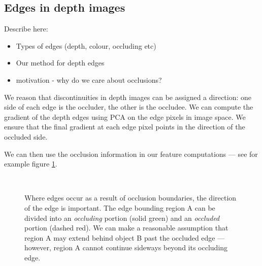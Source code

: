 \documentclass[10pt,twocolumn,letterpaper]{article}
\begin{document}
\subsection{Edges in depth images}
Describe here:
\begin{itemize}
\item Types of edges (depth, colour, occluding etc)
\item Our method for depth edges
\item motivation - why do we care about occlusions?
\end{itemize}

We reason that discontinuities in depth images can be assigned a direction: one side of each edge is the occluder, the other is the occludee. 
We can compute the gradient of the depth edges using PCA on the edge pixels in image space.
We ensure that the final gradient at each edge pixel points in the direction of the occluded side.

We can then use the occlusion information in our feature computations --- see for example figure \ref{fig:occluded_region}.


\begin{figure}
    \centering 
        \hfill
     \\
    \caption{Where edges occur as a result of occlusion boundaries, the direction of the edge is important. The edge bounding region A can be divided into an \emph{occluding} portion (solid green) and an \emph{occluded} portion (dashed red).
    We can make a reasonable assumption that region A may extend behind object B past the occluded edge --- however, region A cannot continue sideways beyond its occluding edge.}
    \label{fig:occluded_region}
\end{figure}
\end{document}
